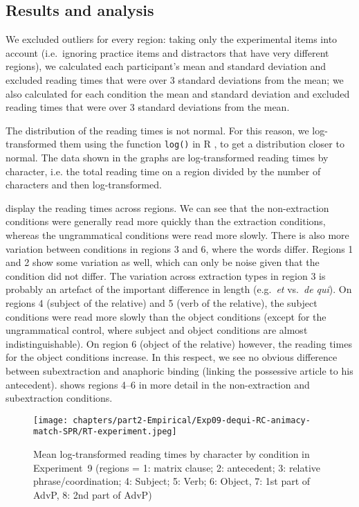 \subsection{Results and analysis}

We excluded outliers for every region: taking only the experimental items into account (i.e.\ ignoring practice items and distractors that have very different regions), we calculated each participant's mean and standard deviation and excluded reading times that were over 3 standard deviations from the mean; we also calculated for each condition the mean and standard deviation and excluded reading times that were over 3 standard deviations from the mean. 

The distribution of the reading times is not normal. For this reason, we log-transformed them using the function \texttt{log()} in R \citep{R}, to get a distribution closer to normal. The data shown in the graphs are log-transformed reading times by character, i.e. the total reading time on a region divided by the number of characters and then log-transformed.

 display the reading times across regions.  We can see that the non-extraction conditions were generally read more quickly than the extraction conditions, whereas the ungrammatical conditions were read more slowly. There is also more variation between conditions in regions 3 and 6, where the words differ. Regions 1 and 2 show some variation as well, which can only be noise given that the condition did not differ. The variation across extraction types in region 3 is probably an artefact of the important difference in length (e.g.\ \emph{et} vs.\ \emph{de qui}). On regions 4 (subject of the relative) and 5 (verb of the relative), the subject conditions were read more slowly than the object conditions (except for the ungrammatical control, where subject and object conditions are almost indistinguishable). On region 6 (object of the relative) however, the reading times for the object conditions increase. In this respect, we see no obvious difference between subextraction and anaphoric binding (linking the possessive article to his antecedent).   shows regions 4--6 in more detail in the non-extraction and subextraction conditions.\largerpage[-1]

\begin{figure}
    \centering
    \texttt{[image: chapters/part2-Empirical/Exp09-dequi-RC-animacy-match-SPR/RT-experiment.jpeg]}
    \caption[Mean log-transformed reading times by character by condition in Experiment 9]{Mean log-transformed reading times by character by condition in Experiment~9
    (regions = 1: matrix clause; 2: antecedent; 3: relative phrase/coordination; 4: Subject; 5: Verb; 6: Object, 7: 1st part of AdvP, 8: 2nd part of AdvP)}
    \label{fig:exp09-rt}
\end{figure}

